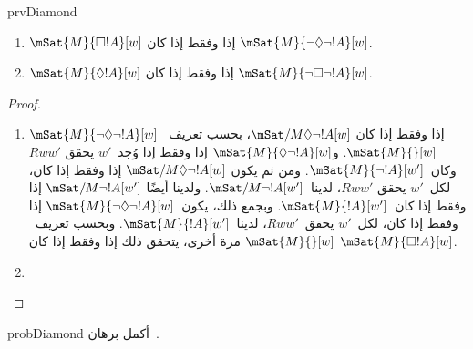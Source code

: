 \documentclass[../../../include/open-logic-section]{subfiles}
\begin{document}
\begin{tagblock}{prvDiamond}
\begin{prop}
  \begin{enumerate}
  \item $\mSat{M}{\Box !A}[w]$ إذا وفقط إذا كان
    $\mSat{M}{\lnot\Diamond\lnot !A}[w]$.
  \item $\mSat{M}{\Diamond !A}[w]$ إذا وفقط إذا كان
    $\mSat{M}{\lnot\Box\lnot !A}[w]$.
  \end{enumerate}
\end{prop}

\begin{proof}
  \begin{enumerate}
    \item $\mSat{M}{\lnot\Diamond\lnot !A}[w]$ إذا وفقط إذا كان
      $\mSat/{M}{\Diamond\lnot !A}[w]$، بحسب تعريف~$\mSat{M}{}[w]$.
      و$\mSat{M}{\Diamond\lnot !A}[w]$ إذا وفقط إذا وُجد~$w'$ يحقق
      $Rww'$ وكان~$\mSat{M}{\lnot !A}[w']$. ومن ثم يكون
      $\mSat/{M}{\Diamond\lnot !A}[w]$ إذا وفقط إذا كان، لكل~$w'$ يحقق
      $Rww'$، لدينا~$\mSat/{M}{\lnot !A}[w']$. ولدينا أيضًا
      $\mSat/{M}{\lnot !A}[w']$ إذا وفقط إذا كان~$\mSat{M}{!A}[w']$.
      وبجمع ذلك، يكون~$\mSat{M}{\lnot\Diamond\lnot !A}[w]$ إذا وفقط
      إذا كان، لكل~$w'$ يحقق~$Rww'$، لدينا~$\mSat{M}{!A}[w']$. وبحسب
      تعريف~$\mSat{M}{}[w]$ مرة أخرى، يتحقق ذلك إذا وفقط إذا كان
      $\mSat{M}{\Box !A}[w]$.
    \item {}
  \end{enumerate}
\end{proof}

\begin{probtag}{probDiamond}
  أكمل برهان~.
\end{probtag}
\end{tagblock}
\end{document}
